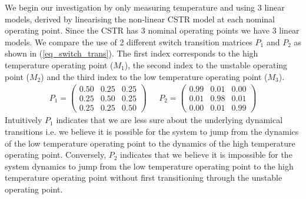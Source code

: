 We begin our investigation by only measuring temperature and using 3 linear models, derived by linearising the non-linear CSTR model at each nominal operating point. Since the CSTR has 3 nominal operating points we have 3 linear models. We compare the use of 2 different switch transition matrices $P_1$ and $P_2$ as shown in (\ref{eq_switch_trans}). The first index corresponds to the high temperature operating point ($M_1$), the second index to the unstable operating point ($M_2$) and the third index to the low temperature operating point ($M_3$).
\begin{equation}
\begin{aligned}
P_1 = \begin{pmatrix}
0.50 & 0.25 & 0.25 \\
0.25 & 0.50 & 0.25 \\
0.25 & 0.25 & 0.50
\end{pmatrix} 
~~~&P_2 = \begin{pmatrix}
0.99 & 0.01 & 0.00 \\
0.01 & 0.98 & 0.01 \\
0.00 & 0.01 & 0.99
\end{pmatrix}
\end{aligned}
\label{eq_switch_trans}
\end{equation}
Intuitively $P_1$ indicates that we are less sure about the underlying dynamical transitions i.e. we believe it is possible for the system to jump from the dynamics of the low temperature operating point to the dynamics of the high temperature operating point. Conversely, $P_2$ indicates that we believe it is impossible for the system dynamics to jump from the low temperature operating point to the high temperature operating point without first transitioning through the unstable operating point. 

